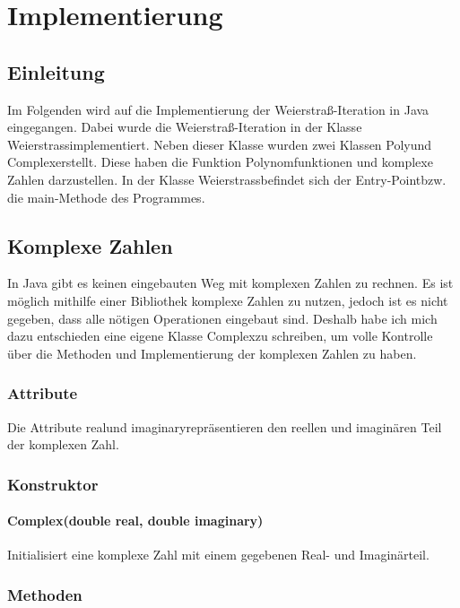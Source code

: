 \documentclass[12pt]{article}
\begin{document}
\section{Implementierung}
\subsection{Einleitung}
Im Folgenden wird auf die Implementierung der Weierstraß-Iteration in Java eingegangen. Dabei wurde die Weierstraß-Iteration in der Klasse \glqq Weierstrass\grqq\space implementiert. Neben dieser Klasse wurden zwei Klassen \glqq Poly\grqq\space und \glqq Complex\grqq\space erstellt. Diese haben die Funktion Polynomfunktionen und komplexe Zahlen darzustellen. In der Klasse \glqq Weierstrass\grqq\space befindet sich der \glqq Entry-Point\grqq\space bzw. die \glqq main\grqq-Methode des Programmes.

\subsection{Komplexe Zahlen}
In Java gibt es keinen eingebauten Weg mit komplexen Zahlen zu rechnen. Es ist möglich mithilfe einer Bibliothek komplexe Zahlen zu nutzen, jedoch ist es nicht gegeben, dass alle nötigen Operationen eingebaut sind. Deshalb habe ich mich dazu entschieden eine eigene Klasse \glqq Complex\grqq\space zu schreiben, um volle Kontrolle über die Methoden und Implementierung der komplexen Zahlen zu haben.

\subsubsection{Attribute}
Die Attribute \glqq real\grqq\space und \glqq imaginary\grqq\space repräsentieren den reellen und imaginären Teil der komplexen Zahl.

\subsubsection{Konstruktor}
\paragraph{Complex(double real, double imaginary)} 
Initialisiert eine komplexe Zahl mit einem gegebenen Real- und Imaginärteil.

\subsubsection{Methoden}
\end{document}
